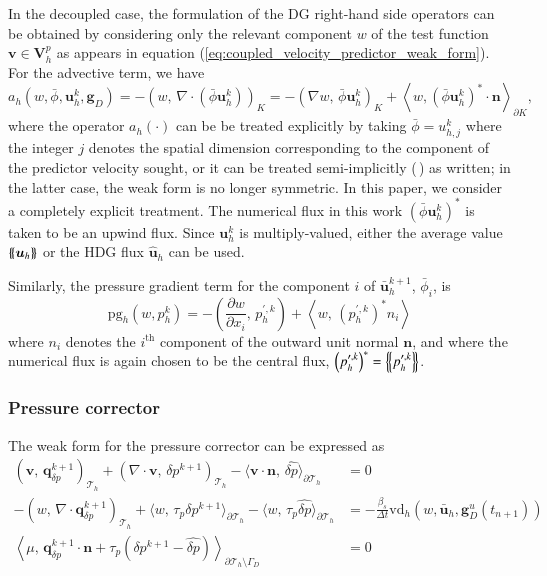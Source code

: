 In the decoupled case, the formulation of the DG right-hand side operators can be obtained by considering only the relevant component $w$ of the test function $\bm{v}\in \bm{V}_h^p$ as appears in equation (\ref{eq:coupled_velocity_predictor_weak_form}). 
For the advective term, we have 
\begin{equation}
  a_h(w,\bar{\phi}, \bm{u}_h^k, \bm{g}_D) 
  = -\left(w,\, \nabla \cdot \left( \bar{\phi}\bm{u}_h^k \right)\right)_K
   = - \left(\nabla w,\, \bar{\phi}\bm{u}^k_h\right)_K
   + \left\langle w, \left(\bar{\phi}\bm{u}_h^k\right)^* \cdot\bm{n} \right\rangle_{\partial K},
\end{equation}
where the operator $a_h(\cdot)$ can be be treated explicitly by taking $\bar{\phi} = u^k_{h,j}$ where the integer $j$ denotes the spatial dimension corresponding to the component of the predictor velocity sought, or it can be treated semi-implicitly (\cf  \,\cite{nguyen_implicit_2009}) as written; in the latter case, the weak form is no longer symmetric.
In this paper, we consider a completely explicit treatment.
The numerical flux in this work $\left(\bar{\phi}\bm{u}_h^k\right)^*$ is taken to be an upwind flux.
Since $\bm{u}_h^k$ is multiply-valued, either the average value $\left\{\!\left\{\bm{u}_h\right\}\!\right\}$ or the HDG flux $\hat{\bm{u}}_h$ can be used.

Similarly, the pressure gradient term for the component $i$ of $\bar{\bm{u}}_h^{k+1}$, $\bar{\phi}_i$, is
\begin{equation}
  \text{pg}_h\left(w,p_h^k\right) = 
    - \left(\frac{\partial w}{\partial x_i},\, p^{\prime,k}_h\right)
    + \left\langle w,\, \left(p^{\prime, k}_h\right)^*n_i \right\rangle
\end{equation}
where $n_i$ denotes the $i^{\text{th}}$ component of the outward unit normal $\bm{n}$, and where the numerical flux is again chosen to be the central flux, $\left(p^{\prime, k}_h\right)^* = \left\{\!\left\{p_h^{\prime,k}\right\}\!\right\}$.

\subsubsection{Pressure corrector}%
The weak form for the pressure corrector can be expressed as 
\begin{equation}
\begin{aligned}
(\bm{v},\,  \bm{q}_{\delta p}^{k+1})_{\mathcal{T}_h}
+ ( \nabla \cdot \bm{v} ,\, \delta p^{k+1})_{\mathcal{T}_h}
- \langle \bm{v}\cdot\bm{n} ,\, \widehat{\delta p} \rangle_{\partial \mathcal{T}_h} &= 0 \\
-(w ,\, \nabla \cdot \bm{q}_{\delta p}^{k+1})_{\mathcal{T}_h}
+ \langle w,\, \tau_p \delta p^{k+1}\rangle_{\partial \mathcal{T}_h} 
- \langle w,\, \tau_p \widehat{\delta p} \rangle_{\partial \mathcal{T}_h} 
&= - \frac{\beta_s}{\Delta t} \text{vd}_h(w,\bar{\bm{u}}_h, \bm{g}_D^u(t_{n+1}))  \\
\left\langle \mu ,\, \bm{q}_{\delta p}^{k+1} \cdot\bm{n} + \tau_p(\delta p^{k+1} - \widehat{\delta p})
\right\rangle_{\partial \mathcal{T}_h \setminus \Gamma_D} &= 0 
\end{aligned}
\end{equation}

